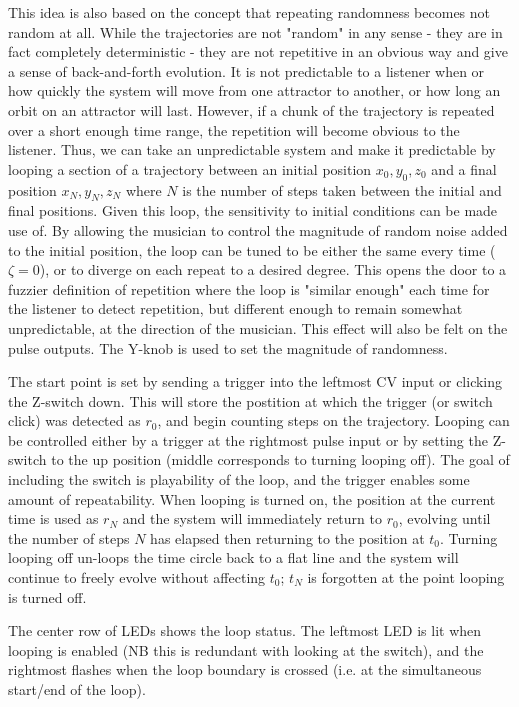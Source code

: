 \documentclass{tufte-handout}
\begin{document}
This idea is also based on the concept that repeating randomness becomes not random at all. While the trajectories are not "random" in any sense - they are in fact completely deterministic - they are not repetitive in an obvious way and give a sense of back-and-forth evolution. It is not predictable to a listener when or how quickly the system will move from one attractor to another, or how long an orbit on an attractor will last. However, if a chunk of the trajectory is repeated over a short enough time range, the repetition will become obvious to the listener. Thus, we can take an unpredictable system and make it predictable by looping a section of a trajectory between an initial position $x_0, y_0, z_0$ and a final position $x_N, y_N, z_N$ where $N$ is the number of steps taken between the initial and final positions. Given this loop, the sensitivity to initial conditions can be made use of. By allowing the musician to control the magnitude of random noise added to the initial position, the loop can be tuned to be either the same every time ($\zeta=0$), or to diverge on each repeat to a desired degree. This opens the door to a fuzzier definition of repetition where the loop is "similar enough" each time for the listener to detect repetition, but different enough to remain somewhat unpredictable, at the direction of the musician. This effect will also be felt on the pulse outputs. The Y-knob is used to set the magnitude of randomness.

The start point is set by sending a trigger into the leftmost CV input or clicking the Z-switch down. This will store the postition at which the trigger (or switch click) was detected as $r_0$, and begin counting steps on the trajectory. Looping can be controlled either by a trigger at the rightmost pulse input or by setting the Z-switch to the up position (middle corresponds to turning looping off). The goal of including the switch is playability of the loop, and the trigger enables some amount of repeatability. When looping is turned on, the position at the current time is used as $r_N$ and the system will immediately return to $r_0$, evolving until the number of steps $N$ has elapsed then returning to the position at $t_0$. Turning looping off un-loops the time circle back to a flat line and the system will continue to freely evolve without affecting $t_0$; $t_N$ is forgotten at the point looping is turned off.

The center row of LEDs shows the loop status. The leftmost LED is lit when looping is enabled (NB this is redundant with looking at the switch), and the rightmost flashes when the loop boundary is crossed (i.e. at the simultaneous start/end of the loop).
\end{document}
